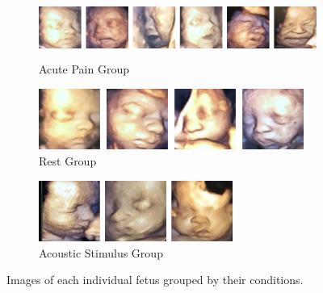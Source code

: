 \begin{figure}[h!tp]
  \centering
  \par\bigskip

  \begin{subfigure}{\linewidth}
    \centering
    \includegraphics[height=2cm, keepaspectratio]{imgs/chap4_ap.png}
    \caption{Acute Pain Group}
  \end{subfigure}

  \par\bigskip

  \begin{subfigure}{\linewidth}
    \centering
    \includegraphics[height=2cm, keepaspectratio]{imgs/chap4_re.png}
    \caption{Rest Group}
  \end{subfigure}

  \par\bigskip

  \begin{subfigure}{\linewidth}
    \centering
    \includegraphics[height=2cm, keepaspectratio]{imgs/chap4_as.png}
    \caption{Acoustic Stimulus Group}
  \end{subfigure}
  
  \caption{Images of each individual fetus grouped by their conditions.}
  \label{fig:fetuses}
\end{figure}  
